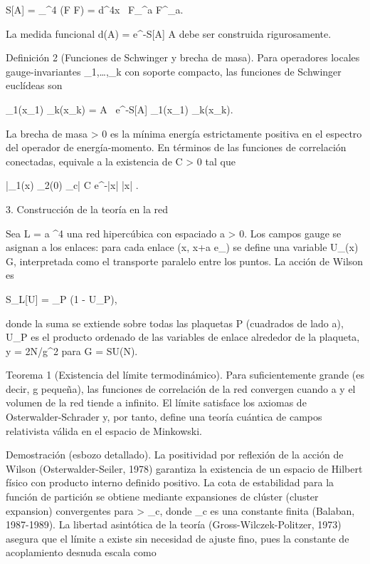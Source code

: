 \documentclass[12pt,a4paper]{book}
\begin{document}
S[A] =  \int_{^4} (F \wedge *F) =  \int d^4x \, F_{\mu\nu}^a F^{\mu\nu}_a.

La medida funcional d\mu(A) = e^{-S[A]} A debe ser construida rigurosamente.

Definición 2 (Funciones de Schwinger y brecha de masa). Para operadores locales gauge-invariantes _1,\dots,_k con soporte compacto, las funciones de Schwinger euclídeas son

\langle {}_1(x_1) \cdots {}_k(x_k) \rangle =  \int {}A \, e^{-S[A]} _1(x_1) \cdots {}_k(x_k).

La brecha de masa \Delta > 0 es la mínima energía estrictamente positiva en el espectro del operador de energía-momento. En términos de las funciones de correlación conectadas, equivale a la existencia de C > 0 tal que

|\langle {}_1(x) _2(0) \rangle_c| \le C e^{-\Delta |x|} \quad {} |x| \to \infty.

3. Construcción de la teoría en la red

Sea L = a ^4 una red hipercúbica con espaciado a > 0. Los campos gauge se asignan a los enlaces: para cada enlace (x, x+a e_\mu) se define una variable U_\mu(x) \in G, interpretada como el transporte paralelo entre los puntos. La acción de Wilson es

S_L[U] = \beta \sum_P  (1 - U_P),

donde la suma se extiende sobre todas las plaquetas P (cuadrados de lado a), U_P es el producto ordenado de las variables de enlace alrededor de la plaqueta, y \beta = 2N/g^2 para G = SU(N).

Teorema 1 (Existencia del límite termodinámico). Para \beta suficientemente grande (es decir, g pequeña), las funciones de correlación de la red convergen cuando a  y el volumen de la red tiende a infinito. El límite satisface los axiomas de Osterwalder-Schrader y, por tanto, define una teoría cuántica de campos relativista válida en el espacio de Minkowski.

Demostración (esbozo detallado). La positividad por reflexión de la acción de Wilson (Osterwalder-Seiler, 1978) garantiza la existencia de un espacio de Hilbert físico con producto interno definido positivo. La cota de estabilidad para la función de partición se obtiene mediante expansiones de clúster (cluster expansion) convergentes para \beta > \beta_c, donde \beta_c es una constante finita (Balaban, 1987-1989). La libertad asintótica de la teoría (Gross-Wilczek-Politzer, 1973) asegura que el límite a  existe sin necesidad de ajuste fino, pues la constante de acoplamiento desnuda escala como
\end{document}
